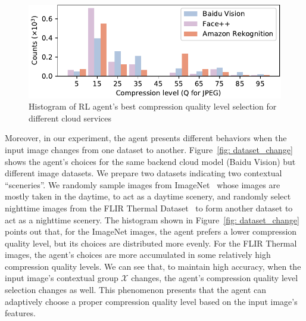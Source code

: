 \begin{figure}[htb]
    \includegraphics[width=\linewidth]{figures/quality_chosen.pdf}
    \caption{Histogram of RL agent's best compression quality level selection for different cloud services}
    \label{fig: quality_chosen}
\end{figure}

Moreover, in our experiment, the agent presents different behaviors when the input image changes from one dataset to another. Figure~\ref{fig: dataset_change} shows the agent's choices for the same backend cloud model (Baidu Vision) but different image datasets. We prepare two datasets indicating two contextual ``sceneries''. We randomly sample images from ImageNet~\cite{ImageNet} whose images are mostly taken in the daytime, to act as a daytime scenery, and randomly select nighttime images from the FLIR Thermal Dataset~\cite{FLIR} to form another dataset to act as a nighttime scenery. The histogram shown in Figure~\ref{fig: dataset_change} points out that, for the ImageNet images, the agent prefers a lower compression quality level, but its choices are distributed more evenly. For the FLIR Thermal images, the agent's choices are more accumulated in some relatively high compression quality levels. We can see that, to maintain high accuracy, when the input image's contextual group $ \mathcal{X} $ changes, the agent's compression quality level selection changes as well. This phenomenon presents that the agent can adaptively choose a proper compression quality level based on the input image's features. %


